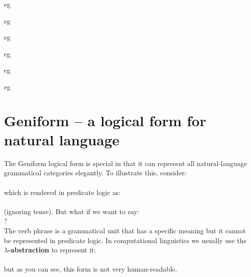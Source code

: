 eg 


eg 

eg 


eg 

eg 

eg 

\titleformat{\subsection}[hang]{\sffamily\bfseries\large\color{blue}}{\thesubsection \hspace{5pt}}{0pt}{}

\renewcommand{\subsubsection}[1]{\sffamily{\bfseries{\color{blue}{ \stepcounter{subsubsection} #1}}}}

\section{Geniform -- a logical form for natural language}
\label{sec:geniform}


The Geniform logical form is special in that it can represent all natural-language grammatical categories elegantly.  To illustrate this, consider:\\
\tab {}\\
which is rendered in predicate logic as:\\
\tab {}\\
(ignoring tense).  But what if we want to say:\\
\tab {} ?\\
The verb phrase  is a grammatical unit that has a specific meaning but it cannot be represented in predicate logic.  In computational linguistics we usually use the \textbf{$\lambda$-abstraction} to represent it:\\
\tab {}\\
but as you can see, this form is not very human-readable.

